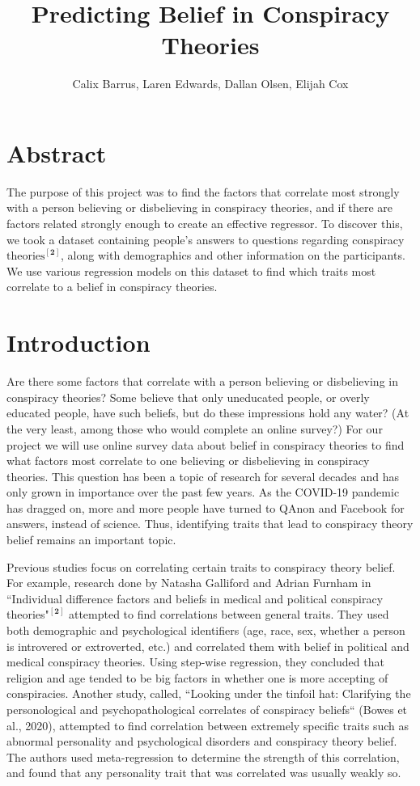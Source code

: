 \documentclass[11pt]{article}
\author{Calix Barrus, Laren Edwards, Dallan Olsen, Elijah Cox}
\title{Predicting Belief in Conspiracy Theories}
\begin{document}
    
    \maketitle
    
        
    \hypertarget{abstract}{%
\section*{Abstract}\label{abstract}}

The purpose of this project was to find the factors that correlate most strongly with
a person believing or disbelieving in conspiracy theories, and if there
are factors related strongly enough to create an effective
regressor. To discover this, we took a dataset containing people's answers to 
questions regarding conspiracy $\text{theories}^{[\textbf{2}]}$, along with demographics and other information
on the participants. We use various regression models on this dataset to find
which traits most correlate to a belief in conspiracy theories.
\section*{Introduction} Are there some factors that correlate with a person
believing or disbelieving in conspiracy theories? Some believe that only
uneducated people, or overly educated people, have such beliefs, but do
these impressions hold any water? (At the very least, among those who
would complete an online survey?) For our project we will use online
survey data about belief in conspiracy theories to find what factors
most correlate to one believing or disbelieving in conspiracy theories.
This question has been a topic of research for several decades and has
only grown in importance over the past few years. As the COVID-19
pandemic has dragged on, more and more people have turned to QAnon and
Facebook for answers, instead of science. Thus, identifying traits that
lead to conspiracy theory belief remains an important topic. 

Previous studies focus on correlating certain traits to conspiracy theory belief.
For example, research done by Natasha Galliford and Adrian Furnham in
``Individual difference factors and beliefs in medical and political
conspiracy theories$\text{"}^{[\mathbf{2}]}$ attempted to find correlations between general
traits. They used both demographic and psychological identifiers (age,
race, sex, whether a person is introvered or extroverted, etc.) and
correlated them with belief in political and medical conspiracy
theories. Using step-wise regression, they concluded that religion and
age tended to be big factors in whether one is more accepting of
conspiracies. Another study, called, ``Looking under the tinfoil hat:
Clarifying the personological and psychopathological correlates of
conspiracy beliefs`` (Bowes et al., 2020), attempted to find correlation
between extremely specific traits such as abnormal personality and
psychological disorders and conspiracy theory belief. The authors used
meta-regression to determine the strength of this correlation, and found
that any personality trait that was correlated was usually weakly so.
\end{document}
